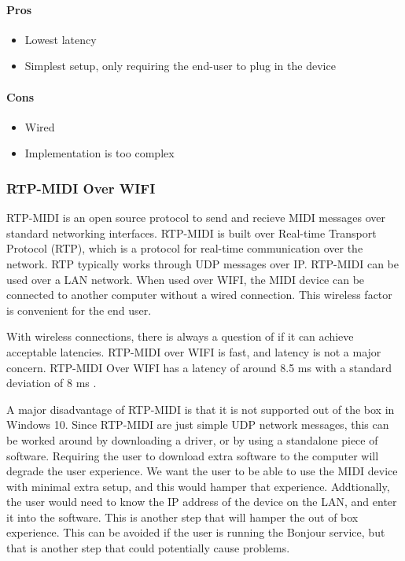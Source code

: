 \paragraph{Pros}

\begin{itemize}
  \item Lowest latency
  \item Simplest setup, only requiring the end-user to plug in the device
\end{itemize}

\paragraph{Cons}

\begin{itemize}
  \item Wired
  \item Implementation is too complex
\end{itemize}

\subsubsection{RTP-MIDI Over WIFI}

RTP-MIDI is an open source protocol to send and recieve MIDI messages over standard
networking interfaces. RTP-MIDI is built over Real-time Transport Protocol (RTP), which is
a protocol for real-time communication over the network. RTP typically works through UDP
messages over IP. RTP-MIDI can be used over a LAN network. When used over WIFI, the MIDI
device can be connected to another computer without a wired connection. This wireless
factor is convenient for the end user.

With wireless connections, there is always a question of if it can achieve acceptable
latencies. RTP-MIDI over WIFI is fast, and latency is not a major concern. RTP-MIDI Over
WIFI has a latency of around 8.5 ms with a standard deviation of 8 ms
\autocite{ble-latency}.

A major disadvantage of RTP-MIDI is that it is not supported out of the box in Windows 10.
Since RTP-MIDI are just simple UDP network messages, this can be worked around by
downloading a driver, or by using a standalone piece of software. Requiring the user to
download extra software to the computer will degrade the user experience. We want the user
to be able to use the MIDI device with minimal extra setup, and this would hamper that
experience. Addtionally, the user would need to know the IP address of the device on the
LAN, and enter it into the software. This is another step that will hamper the out of box
experience. This can be avoided if the user is running the Bonjour service, but that is
another step that could potentially cause problems.

